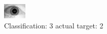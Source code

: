 \begin{figure}[h!]
\begin{center}
\includegraphics[width=0.60\columnwidth]{figures/ID1767_class_3_target_2.png}
\end{center}
\caption{ Classification: 3 actual target: 2}
\label{fig:ID1767_class_3_target_2}
\end{figure}
